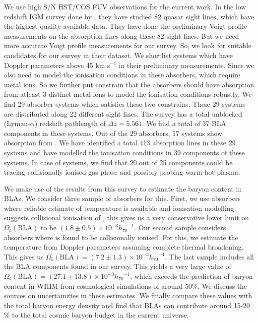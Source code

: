 We use high S/N HST/COS FUV observations for the current work. In the low redshift IGM survey done by \citet{danforth-2016}, they have studied 82 quasar sight lines, which have the highest quality available data. They have done the preliminary Voigt profile measurements on the absorption lines along these 82 sight lines. But we need more accurate Voigt profile measurements for our survey. So, we look for suitable candidates for our survey in their dataset. We shortlist systems which have  Doppler parameters above 45 km s$^{-1}$ in their preliminary measurements. Since we also need to model the ionisation conditions in these absorbers, which require metal ions. So we further put constrain that the absorbers should have absorption from atleast 3 distinct metal ions to model the ionisation conditions robustly. We find 29 absorber systems which satisfies these two constrains. These 29 systems are distributed along 22 different sight lines. The survey has a total unblocked  (Lyman-$\alpha$) redshift pathlength of $\Delta z = 5.561$.  We find a total of 37 BLA components in these systems. Out of the 29 absorbers, 17 systems show absorption from . We have identified a total 413 absorption lines in these 29 systems and have modelled the ionisation conditions in 39 components of these systems. In case of  systems, we find that 20 out of 25  components could be tracing collisionally ionised gas phase and possibly probing warm-hot plasma. 

We make use of the results from this survey to estimate the baryon content in BLAs. We consider three sample of absorbers for this. First, we use absorbers where reliable estimate of temperature is available and ionisation modelling suggests collisional ionisation of , this gives us a very conservative lower limit on $\Omega_b(\text{BLA})$ to be $(1.8 \pm 0.5) \times 10^{-3} {h_{70}}^{-1}$. Our second sample considers absorbers where  is found to be collisionally ionised. For this, we estimate the temperature from Doppler parameters assuming complete thermal broadening. This gives us $\Omega_b(\text{BLA})=(7.2 \pm 1.3) \times 10^{-3} {h_{70}}^{-1}$. The last sample includes all the BLA components found in our survey. This yields a very large value of $\Omega_b(\text{BLA})=(27.1 \pm 13.8) \times 10^{-3} {h_{70}}^{-1}$, which exceeds the prediction of baryon content in WHIM from cosmological simulations of around 50\%. We discuss the sources on uncertainities in these estimates. We finally compare these values with the total baryon energy density and find that BLAs can contribute around 15-20 \% to the total cosmic baryon budget in the current universe.

